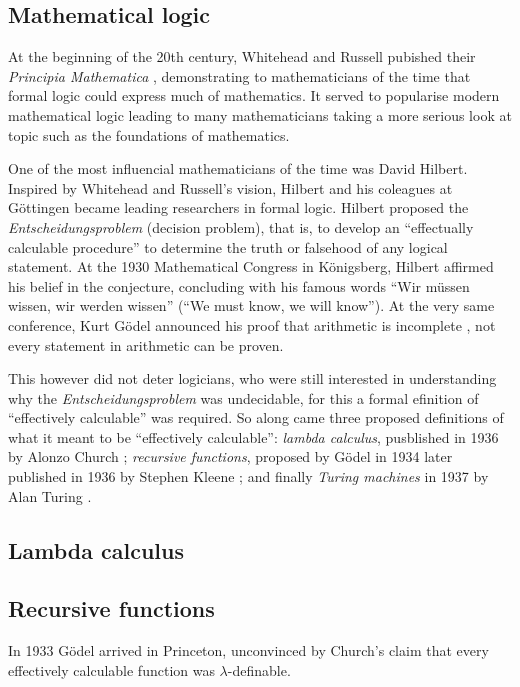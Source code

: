 \subsection{Mathematical logic}

At the beginning of the 20th century, Whitehead and Russell pubished their \emph{Principia Mathematica} \cite{GlossarWiki:Whitehead_Russell:1910}, demonstrating to mathematicians of the time that formal logic could express much of mathematics. It served to popularise modern mathematical logic leading to many mathematicians taking a more serious look at topic such as the foundations of mathematics.

One of the most influencial mathematicians of the time was David Hilbert. Inspired by Whitehead and Russell's vision, Hilbert and his coleagues at G\"ottingen became leading researchers in formal logic. Hilbert proposed the \emph{Entscheidungsproblem} (decision problem), that is, to develop an ``effectually calculable procedure'' to determine the truth or falsehood of any logical statement. At the 1930 Mathematical Congress in K\"onigsberg, Hilbert affirmed his belief in the conjecture, concluding with his famous words ``Wir m\"ussen wissen, wir werden wissen'' (``We must know, we will know''). At the very same conference, Kurt G\"odel announced his proof that arithmetic is incomplete \cite{GlossarWiki:Goedel:1931}, not every statement in arithmetic can be proven.

This however did not deter logicians, who were still interested in understanding why the \emph{Entscheidungsproblem} was undecidable, for this a formal efinition of ``effectively calculable'' was required. So along came three proposed definitions of what it meant to be ``effectively calculable'': \emph{lambda calculus}, pusblished in 1936 by Alonzo Church \cite{church-unsolvableproblemof-1936}; \emph{recursive functions}, proposed by G\"odel in 1934 later published in 1936 by Stephen Kleene \cite{Kleene1936}; and finally \emph{Turing machines} in 1937 by Alan Turing \cite{turing1936a}.

\subsection{Lambda calculus}

\subsection{Recursive functions}

In 1933 G\"odel arrived in Princeton, unconvinced by Church's claim that every effectively calculable function was $\lambda$-definable. 

